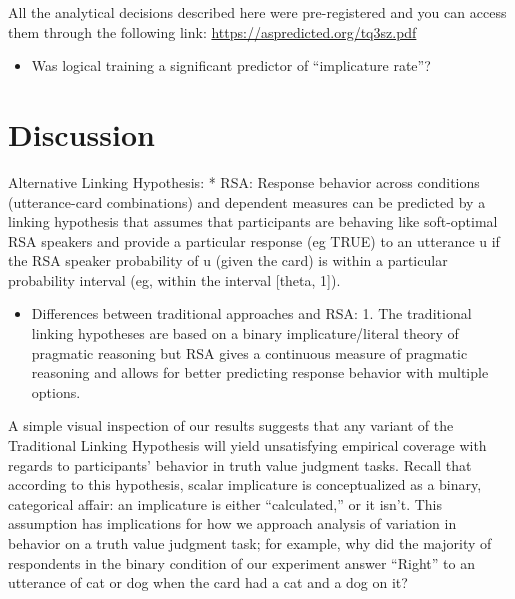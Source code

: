 \documentclass[floatsintext,man]{apa6}
\providecommand{\tightlist}{%
  \setlength{\itemsep}{0pt}\setlength{\parskip}{0pt}}
\theoremstyle{definition}
\theoremstyle{definition}
\theoremstyle{definition}
\theoremstyle{remark}
\begin{document}
All the analytical decisions described here were pre-registered and you
can access them through the following link:
\url{https://aspredicted.org/tq3sz.pdf}

\begin{itemize}
\tightlist
\item
  Was logical training a significant predictor of \enquote{implicature
  rate}?
\end{itemize}

\section{Discussion}\label{discussion}

Alternative Linking Hypothesis: * RSA: Response behavior across
conditions (utterance-card combinations) and dependent measures can be
predicted by a linking hypothesis that assumes that participants are
behaving like soft-optimal RSA speakers and provide a particular
response (eg TRUE) to an utterance u if the RSA speaker probability of u
(given the card) is within a particular probability interval (eg, within
the interval {[}theta, 1{]}).

\begin{itemize}
\tightlist
\item
  Differences between traditional approaches and RSA: 1. The traditional
  linking hypotheses are based on a binary implicature/literal theory of
  pragmatic reasoning but RSA gives a continuous measure of pragmatic
  reasoning and allows for better predicting response behavior with
  multiple options.
\end{itemize}

A simple visual inspection of our results suggests that any variant of
the Traditional Linking Hypothesis will yield unsatisfying empirical
coverage with regards to participants' behavior in truth value judgment
tasks. Recall that according to this hypothesis, scalar implicature is
conceptualized as a binary, categorical affair: an implicature is either
\enquote{calculated,} or it isn't. This assumption has implications for
how we approach analysis of variation in behavior on a truth value
judgment task; for example, why did the majority of respondents in the
binary condition of our experiment answer \enquote{Right} to an
utterance of cat or dog when the card had a cat and a dog on it?
\end{document}
